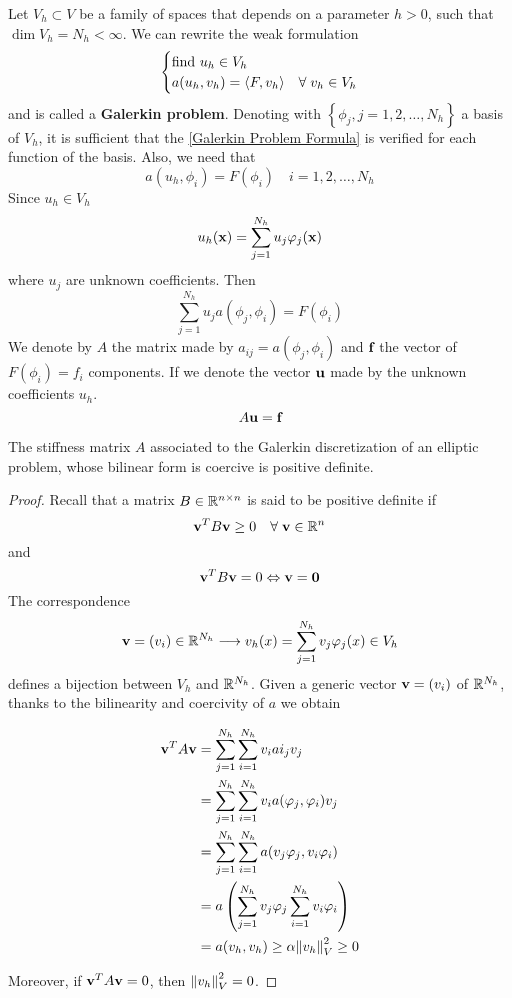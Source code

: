 Let \(V_h \subset V\) be a family of spaces that depends on a parameter \(h > 0\), such that \(\dim V_h = N_h < \infty\).
We can rewrite the weak formulation 
\begin{equation}
    \begin{cases}
        \text{find } u_h \in V_h\\
        a(u_h,v_h) = \langle F,v_h \rangle & \forall \; v_h \in V_h \label{Galerkin Problem Formula}
    \end{cases}
\end{equation}
and is called a \textbf{Galerkin problem}. Denoting with \(\left\{\phi_j, j = 1,2,\ldots,N_h\right\}\) a basis of \(V_h\), it is sufficient that the \eqref{Galerkin Problem Formula} is verified for each function of the basis. 
Also, we need that 
\[
    a(u_h, \phi_i) = F(\phi_i) \quad i = 1, 2, \ldots , N_h
\]
Since \(u_h \in V_h\)
\[
    u_h(\textbf{x})=\sum_{j=1}^{N_h} u_j \varphi_j(\textbf{x})
\]
where \(u_j\) are unknown coefficients. Then
\[
    \sum_{j=1}^{N_h}u_j a(\phi_j, \phi_i) = F(\phi_i)
\]
We denote by \(A\) the matrix made by \(a_{ij} = a(\phi_j, \phi_i)\) and \(\textbf{f}\) the vector of \(F(\phi_i) = f_i\) components. If we denote the vector \(\textbf{u}\) made by the unknown coefficients \(u_h\).
\begin{equation}
    A\textbf{u} = \textbf{f}
    \label{Linear system Galerkin}
\end{equation}

    \begin{theorem}
    The stiffness matrix \(A\) associated to the Galerkin discretization of an elliptic problem, whose bilinear form is coercive is positive definite.
\end{theorem}
\begin{proof}
    Recall that a matrix \(B \in \mathbb{R}^{n\times n}\) is said to be positive definite if 
    \[
        \textbf{v}^TB\textbf{v} \geq 0 \quad \forall \; \textbf{v} \in \mathbb{R}^n
    \]
    and
    \[
        \textbf{v}^T B \textbf{v} = 0 \Leftrightarrow \textbf{v} = \textbf{0}
    \]
    The correspondence 
    \[
        \textbf{v} = (v_i) \in \mathbb{R}^{N_h} \longrightarrow v_h(x) = \sum_{j=1}^{N_h} v_j\varphi_j(x) \in V_h
    \]
    defines a bijection between \(V_h\) and \(\mathbb{R}^{N_h}\). Given a generic vector \(\textbf{v} = (v_i)\) of \(\mathbb{R}^{N_h}\), thanks to the bilinearity and coercivity of \(a\) we obtain 
    
        \begin{align*}
        \textbf{v}^T A \textbf{v} & = \sum_{j=1}^{N_h}\sum_{i=1}^{N_h} v_i ai_j v_j \\
        & = \sum_{j=1}^{N_h}\sum_{i=1}^{N_h} v_ia(\varphi_j, \varphi_i)v_j\\
        & = \sum_{j=1}^{N_h}\sum_{i=1}^{N_h} a(v_j\varphi_j, v_i \varphi_i)\\
        & = a\left(\sum_{j=1}^{N_h}v_j\varphi_j\sum_{i=1}^{N_h}v_i\varphi_i\right)\\
        & = a(v_h,v_h) \geq \alpha \norm{v_h}_V^2 \geq 0
        \end{align*}

    Moreover, if \(\textbf{v}^T A \textbf{v} = 0\), then \(\norm{v_h}_V^2 = 0\).
\end{proof}


